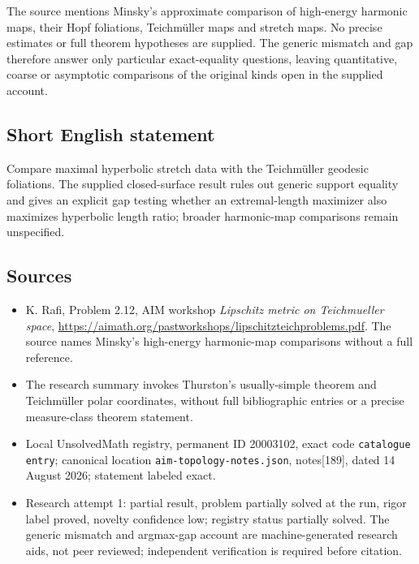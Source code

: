 \documentclass[11pt]{article}
\begin{document}
The source mentions Minsky's approximate comparison of high-energy harmonic maps, their Hopf foliations, Teichm\"uller maps and stretch maps. No precise estimates or full theorem hypotheses are supplied. The generic mismatch and gap therefore answer only particular exact-equality questions, leaving quantitative, coarse or asymptotic comparisons of the original kinds open in the supplied account.
\subsection{Short English statement}
Compare maximal hyperbolic stretch data with the Teichm\"uller geodesic foliations. The supplied closed-surface result rules out generic support equality and gives an explicit gap testing whether an extremal-length maximizer also maximizes hyperbolic length ratio; broader harmonic-map comparisons remain unspecified.
\subsection{Sources}
\begin{itemize}
\item K. Rafi, Problem 2.12, AIM workshop \emph{Lipschitz metric on Teichmueller space}, \url{https://aimath.org/pastworkshops/lipschitzteichproblems.pdf}. The source names Minsky's high-energy harmonic-map comparisons without a full reference.
\item The research summary invokes Thurston's usually-simple theorem and Teichm\"uller polar coordinates, without full bibliographic entries or a precise measure-class theorem statement.
\item Local UnsolvedMath registry, permanent ID 20003102, exact code \texttt{catalogue entry}; canonical location \texttt{aim-topology-notes.json}, notes[189], dated 14 August 2026; statement labeled exact.
\item Research attempt 1: partial result, problem partially solved at the run, rigor label proved, novelty confidence low; registry status partially solved. The generic mismatch and argmax-gap account are machine-generated research aids, not peer reviewed; independent verification is required before citation.
\end{itemize}
\end{document}
